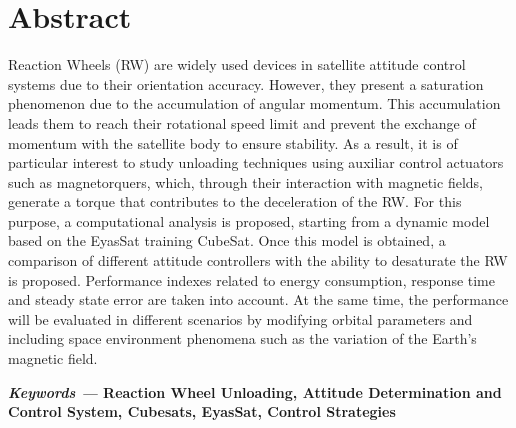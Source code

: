 \newpage

\section*{Abstract}
%



\noindent Reaction Wheels (RW) are widely used devices in satellite attitude control systems due to their orientation accuracy. However, they present a saturation phenomenon due to the accumulation of angular momentum. This accumulation leads them to reach their rotational speed limit and prevent the exchange of momentum with the satellite body to ensure stability. As a result, it is of particular interest to study unloading techniques using auxiliar control actuators such as magnetorquers, which, through their interaction with magnetic fields, generate a torque that contributes to the deceleration of the RW. For this purpose, a computational analysis is proposed, starting from a dynamic model based on the EyasSat training CubeSat. Once this model is obtained, a comparison of different attitude controllers with the ability to desaturate the RW is proposed. Performance indexes related to energy consumption, response time and steady state error are taken into account. At the same time, the performance will be evaluated in different scenarios by modifying orbital parameters and including space environment phenomena such as the variation of the Earth's magnetic field.


\vspace{1cm}\textbf{\textit{Keywords ---}  Reaction Wheel Unloading, Attitude Determination and Control System, Cubesats, EyasSat, Control Strategies}


\newpage

